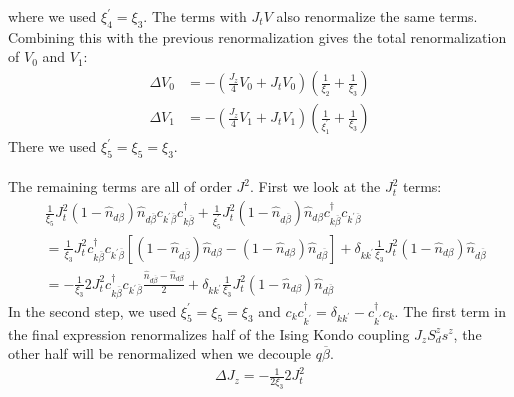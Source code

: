 \documentclass[twoside,11pt]{report}
\numberwithin{equation}{section}
\begin{document}
where we used \(\xi_4^\prime = \xi_3\). The terms with \(J_t V\) also renormalize the same terms. Combining this with the previous renormalization gives the total renormalization of \(V_0\) and \(V_1\):
\begin{equation}\begin{aligned}
	\label{V}
	\Delta V_0 &= -\left(\frac{J_z}{4}V_0 + J_t V_0\right) \left(\frac{1}{\xi_2} + \frac{1}{\xi_3}\right)\\
	\Delta V_1 &= -\left(\frac{J_z}{4}V_1 + J_t V_1\right) \left(\frac{1}{\xi^\prime_1} + \frac{1}{\xi_3}\right)
\end{aligned}\end{equation}
There we used \(\xi_5^\prime = \xi_5 = \xi_3\).
\\\\The remaining terms are all of order \(J^2\). First we look at the \(J_t^2\) terms:
\begin{equation}\begin{aligned}
&\frac{1}{\xi_5}J_t^2 \left( 1 - \hat n_{d\beta} \right) \hat n_{d\overline\beta} c_{k^\prime\overline\beta}c^\dagger_{k\overline\beta} + \frac{1}{\xi^\prime_5}J_t^2 \left( 1 - \hat n_{d\overline\beta} \right) \hat n_{d\beta} c^\dagger_{k\overline\beta} c_{k^\prime\overline\beta}\\
&=\frac{1}{\xi_3}J_t^2 c^\dagger_{k\overline\beta} c_{k^\prime\overline\beta}\left[\left( 1 - \hat n_{d\overline\beta} \right) \hat n_{d\beta} - \left( 1 - \hat n_{d\beta} \right) \hat n_{d\overline\beta}\right]  + \delta_{kk^\prime} \frac{1}{\xi_3}J_t^2\left( 1 - \hat n_{d\beta} \right) \hat n_{d\overline\beta}\\
&=-\frac{1}{\xi_3}2J_t^2 c^\dagger_{k\overline\beta} c_{k^\prime\overline\beta}\frac{\hat n_{d\overline\beta} - \hat n_{d\beta}}{2}  + \delta_{kk^\prime} \frac{1}{\xi_3}J_t^2\left( 1 - \hat n_{d\beta} \right) \hat n_{d\overline\beta}
\end{aligned}\end{equation}
In the second step, we used \(\xi_5^\prime = \xi_5 = \xi_3\) and \(c_k c^\dagger_{k^\prime} = \delta_{kk^\prime} - c^\dagger_{k^\prime}c_k\). The first term in the final expression renormalizes half of the Ising Kondo coupling \(J_z S^z_d s^z\), the other half will be renormalized when we decouple \(q\overline\beta\).
\begin{equation}\begin{aligned}
	\label{Jz}
	\Delta J_z = -\frac{1}{2\xi_3}2J_t^2
\end{aligned}\end{equation}
\end{document}
